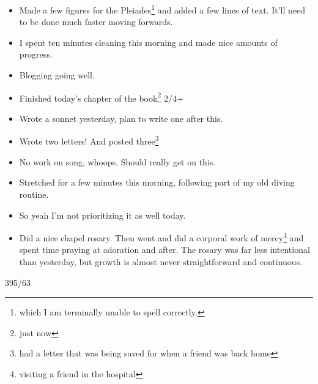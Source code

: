 \documentclass[12pt]{article}[titlepage]
\newcommand{\1}{\={a}}
\newcommand{\2}{\={e}}
\newcommand{\3}{\={\i}}
\newcommand{\4}{\=o}
\newcommand{\5}{\=u}
\newcommand{\6}{\={A}}
\renewcommand{\,}{\textsuperscript{,}}
\begin{document}
\begin{itemize}
\item Made a few figures for the Pleiades\footnote{which I am terminally unable to spell correctly.} and added a few lines of text. It'll need to be done much faster moving forwards.
\item I spent ten minutes cleaning this morning and made nice amounts of progress.
\item Blogging going well.
\item Finished today's chapter of the book\footnote{just now} 2/4+
\item Wrote a sonnet yesterday, plan to write one after this.
\item Wrote two letters! And posted three\footnote{had a letter that was being saved for when a friend was back home}
\item No work on song, whoops. Should really get on this.
\item Stretched for a few minutes this morning, following part of my old diving routine.
\item So yeah I'm not prioritizing it as well today.
\item Did a nice chapel rosary. Then went and did a corporal work of mercy\footnote{visiting a friend in the hospital} and spent time praying at adoration and after.
The rosary was far less intentional than yesterday, but growth is almost never straightforward and continuous.
\end{itemize}

395/63
\end{document}
